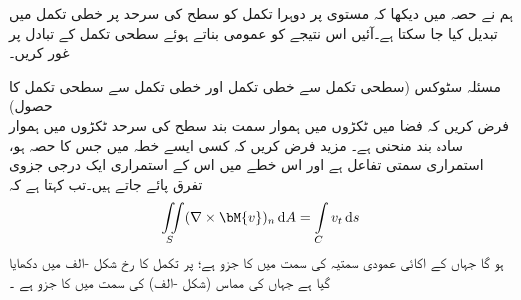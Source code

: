 ہم نے حصہ  میں دیکھا کہ مستوی پر دوہرا تکمل کو سطح کی سرحد پر خطی تکمل میں تبدیل کیا جا سکتا ہے۔آئیں اس نتیجے کو عمومی بناتے ہوئے سطحی تکمل کے تبادل پر غور کریں۔

\quad مسئلہ سٹوکس (سطحی تکمل سے خطی تکمل اور خطی تکمل سے سطحی تکمل کا حصول)\\
فرض کریں کہ فضا میں ٹکڑوں میں ہموار سمت بند سطح  کی سرحد  ٹکڑوں میں ہموار سادہ بند منحنی  ہے۔ مزید فرض کریں کہ کسی ایسے خطہ میں جس کا  حصہ ہو،  استمراری سمتی تفاعل ہے اور اس خطے میں اس  کے استمراری ایک درجی جزوی تفرق پائے جاتے ہیں۔تب  کہتا ہے کہ
\begin{align}\label{مساوات_خطی_تکمل_سٹوکس_الف}
\iint\limits_S (\nabla \times \bM{v})_n \dif A=\int\limits_C v_t \dif s
\end{align}
ہو گا جہاں  کے اکائی عمودی سمتیہ  کی سمت میں  کا جزو  ہے؛  پر تکمل کا رخ شکل -الف میں دکھایا گیا ہے جہاں  کی مماس  (شکل -الف) کی سمت میں   کا جزو  ہے ۔
